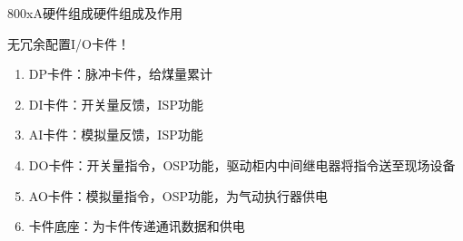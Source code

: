 \documentclass[12pt,hyperref={CJKbookmarks=true}]{beamer} %
\begin{document}
\begin{frame}{800xA硬件组成}{硬件组成及作用}
\begin{alertblock}{\heiti 无冗余配置I/O卡件！}
			\begin{enumerate}
				\item  DP卡件：脉冲卡件，给煤量累计
				
				\item  DI卡件：开关量反馈，ISP功能
				
				\item  AI卡件：模拟量反馈，ISP功能
				
				\item  DO卡件：开关量指令，OSP功能，驱动柜内中间继电器将指令送至现场设备
				
				\item  AO卡件：模拟量指令，OSP功能，为气动执行器供电
				
				\item  卡件底座：为卡件传递通讯数据和供电
			\end{enumerate}
		\end{alertblock}
\end{frame}
\end{document}
